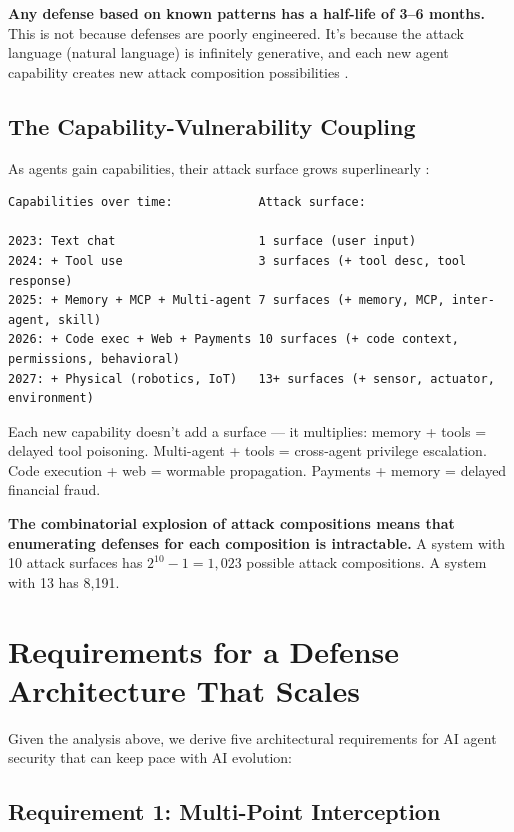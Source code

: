 \documentclass[11pt,letterpaper]{article}
\begin{document}
\textbf{Any defense based on known patterns has a half-life of 3--6 months.} This is not because defenses are poorly engineered. It's because the attack language (natural language) is infinitely generative, and each new agent capability creates new attack composition possibilities \cite{promptkillchain}.


\subsection{The Capability-Vulnerability Coupling}

As agents gain capabilities, their attack surface grows superlinearly \cite{kim2026}:

\begin{lstlisting}
Capabilities over time:            Attack surface:

2023: Text chat                    1 surface (user input)
2024: + Tool use                   3 surfaces (+ tool desc, tool response)
2025: + Memory + MCP + Multi-agent 7 surfaces (+ memory, MCP, inter-agent, skill)
2026: + Code exec + Web + Payments 10 surfaces (+ code context, permissions, behavioral)
2027: + Physical (robotics, IoT)   13+ surfaces (+ sensor, actuator, environment)
\end{lstlisting}

Each new capability doesn't add a surface --- it multiplies: memory + tools = delayed tool poisoning. Multi-agent + tools = cross-agent privilege escalation. Code execution + web = wormable propagation. Payments + memory = delayed financial fraud.

\textbf{The combinatorial explosion of attack compositions means that enumerating defenses for each composition is intractable.} A system with 10 attack surfaces has $2^{10} - 1 = 1{,}023$ possible attack compositions. A system with 13 has 8,191.


\section{Requirements for a Defense Architecture That Scales}
\label{sec:requirements}

Given the analysis above, we derive five architectural requirements for AI agent security that can keep pace with AI evolution:

\subsection{Requirement 1: Multi-Point Interception}
\end{document}
